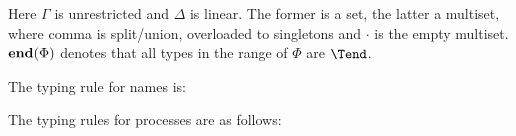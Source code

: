 Here $\Gamma$ is unrestricted and $\Delta$ is linear. The former is a set, the latter a multiset, where comma is split/union, overloaded to singletons and $\cdot$ is the empty multiset.  $\tend \Phi$ denotes that all types in the range of $\Phi$ are $\Tend$.
The typing rule for names is:
\begin{mathpar}
\end{mathpar}
The typing rules for processes are as follows:

